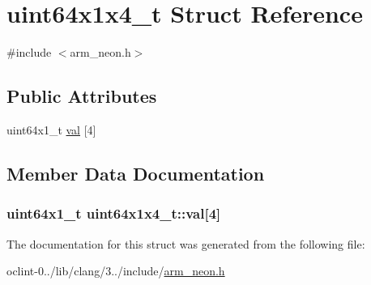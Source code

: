\hypertarget{structuint64x1x4__t}{\section{uint64x1x4\-\_\-t Struct Reference}
\label{structuint64x1x4__t}
}


{\ttfamily \#include $<$arm\-\_\-neon.\-h$>$}

\subsection*{Public Attributes}
\begin{DoxyCompactItemize}
\item 
uint64x1\-\_\-t \hyperlink{structuint64x1x4__t_aa6dc44b1d6189823f391dfcd157bdf8b}{val} \mbox{[}4\mbox{]}
\end{DoxyCompactItemize}


\subsection{Member Data Documentation}
\hypertarget{structuint64x1x4__t_aa6dc44b1d6189823f391dfcd157bdf8b}{
\subsubsection[{val}]{\setlength{\rightskip}{0pt plus 5cm}uint64x1\-\_\-t uint64x1x4\-\_\-t\-::val\mbox{[}4\mbox{]}}}\label{structuint64x1x4__t_aa6dc44b1d6189823f391dfcd157bdf8b}


The documentation for this struct was generated from the following file\-:\begin{DoxyCompactItemize}
\item 
oclint-\/0../lib/clang/3../include/\hyperlink{arm__neon_8h}{arm\-\_\-neon.\-h}\end{DoxyCompactItemize}
